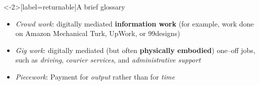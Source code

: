 \documentclass[presentation]{subfiles}
\begin{document}

\begin{frame}<-2>[label=returnable]{A brief glossary}
      \begin{itemize}
        \item<1-> \textit{Crowd work}: digitally mediated \textbf{information work}
        (for example, work done on Amazon Mechanical Turk, UpWork, or 99designs)~\cite{crowdworkFuture}
        \item<2-> \textit{Gig work}: digitally mediated (but often \textbf{physically embodied}) one--off jobs,
        such as
        \textit{driving},
        \textit{courier services},
        and \textit{administrative support}~\cite{friedman2014workers,Parigi:2016:GE:3026779.3013496}
        \item<3-> \textit{Piecework}: Payment for \textit{output} rather than for \textit{time}
      \end{itemize}
\end{frame}
\end{document}
